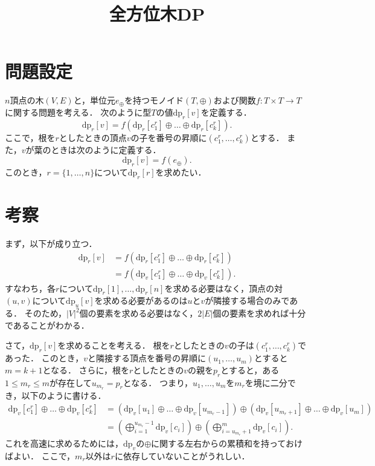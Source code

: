 \documentclass{jsarticle}
\title{全方位木DP}
\newcommand{\DP}{\mathrm{dp}}
\begin{document}
\maketitle

\section{問題設定}
$n$頂点の木$(V, E)$と，単位元$e_\oplus$を持つモノイド$(T, \oplus)$および関数$f:T\times T\to T$に関する問題を考える．
次のように型$T$の値$\DP_r[v]$を定義する．
\[\DP_r[v] = f(\DP_r[c_1^r] \oplus \dots \oplus \DP_r[c_k^r]).\]
ここで，根を$r$としたときの頂点$v$の子を番号の昇順に$(c_1^r, \dots, c_k^r)$とする．
また，$v$が葉のときは次のように定義する．
\[\DP_r[v] = f(e_\oplus).\]
このとき，$r = \{1, \dots, n\}$について$\DP_r[r]$を求めたい．

\section{考察}

まず，以下が成り立つ．
\begin{align*}
  \DP_r[v] &= f(\DP_r[c_1^r] \oplus \dots \oplus \DP_r[c_k^r])\\
  &= f(\DP_v[c_1^r] \oplus \dots \oplus \DP_v[c_k^r]).
\end{align*}
すなわち，各$r$について$\DP_r[1], \dots, \DP_r[n]$を求める必要はなく，頂点の対$(u, v)$について$\DP_u[v]$を求める必要があるのは$u$と$v$が隣接する場合のみである．
そのため，$|V|^2$個の要素を求める必要はなく，$2|E|$個の要素を求めれば十分であることがわかる．

さて，$\DP_r[v]$を求めることを考える．
根を$r$としたときの$v$の子は$(c_1^r, \dots, c_k^r)$であった．
このとき，$v$と隣接する頂点を番号の昇順に$(u_1, \dots, u_m)$とすると$m = k+1$となる．
さらに，根を$r$としたときの$v$の親を$p_r$とすると，ある$1\le m_r\le m$が存在して$u_{m_r} = p_r$となる．
つまり，$u_1, \dots, u_m$を$m_r$を境に二分でき，以下のように書ける．
\begin{align*}
  \DP_v[c_1^r]\oplus\dots\oplus\DP_v[c_k^r]
  &= (\DP_v[u_1]\oplus\dots\oplus\DP_v[u_{m_r-1}])\oplus(\DP_v[u_{m_r+1}]\oplus\dots\oplus\DP_v[u_m])\\
  &= \left(\bigoplus_{i=1}^{u_{m_r}-1} \DP_v[c_i]\right)\oplus\left(\bigoplus_{i=u_{m_r}+1}^m\DP_v[c_i]\right)
  .
\end{align*}
これを高速に求めるためには，$\DP_v$の$\oplus$に関する左右からの累積和を持っておけばよい．
ここで，$m_r$以外は$r$に依存していないことがうれしい．
\end{document}
